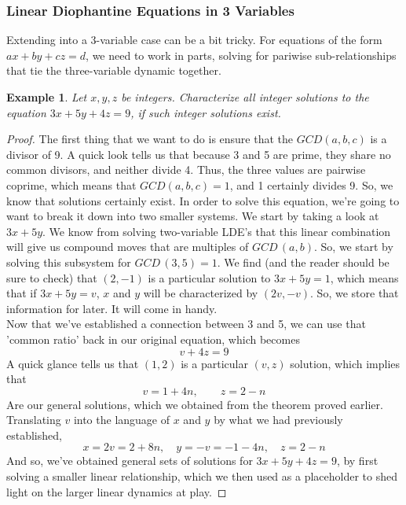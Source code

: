 \documentclass{article}
\newtheorem{example}{Example}
\newcommand{\GCD}[2]{GCD\,(#1, #2)}
\begin{document}
\subsubsection*{Linear Diophantine Equations in 3 Variables} 
Extending into a 3-variable case can be a bit tricky. For equations of the form $ax + by + cz = d$, we need to work in parts, solving for pariwise sub-relationships that tie the three-variable dynamic together. \\ 
\begin{mdframed} 
\begin{example} 
Let $x, y, z$ be integers. Characterize all integer solutions to the equation $3x + 5y + 4z = 9$, if such integer solutions exist. 
\end{example} 
\begin{proof} 
The first thing that we want to do is ensure that the $GCD(a, b, c)$ is a divisor of 9. A quick look tells us that because 3 and 5 are prime, they share no common divisors, and neither divide 4. Thus, the three values are pairwise coprime, which means that $GCD(a, b, c) = 1$, and 1 certainly divides 9. So, we know that solutions certainly exist. In order to solve this equation, we're going to want to break it down into two smaller systems. We start by taking a look at $3x + 5y$. We know from solving two-variable LDE's that this linear combination will give us compound moves that are multiples of $\GCD{a}{b}$. So, we start by solving this subsystem for $\GCD{3}{5} = 1$. We find (and the reader should be sure to check) that $(2, -1)$ is a particular solution to $3x + 5y = 1$, which means that if $3x + 5y = v$, $x$ and $y$ will be characterized by $(2v, -v)$. So, we store that information for later. It will come in handy. \\
Now that we've established a connection between 3 and 5, we can use that 'common ratio' back in our original equation, which becomes 
\[v + 4z = 9\]
A quick glance tells us that $(1, 2)$ is a particular $(v, z)$ solution, which implies that 
\[v = 1 + 4n, \qquad z = 2 - n\]
Are our general solutions, which we obtained from the theorem proved earlier. Translating $v$ into the language of $x$ and $y$ by what we had previously established, 
\[x = 2v = 2 + 8n, \quad y = -v = -1 -4n, \quad z = 2 - n\]
And so, we've obtained general sets of solutions for $3x + 5y + 4z = 9$, by first solving a smaller linear relationship, which we then used as a placeholder to shed light on the larger linear dynamics at play. 
\end{proof}
\end{mdframed} 
\end{document}
